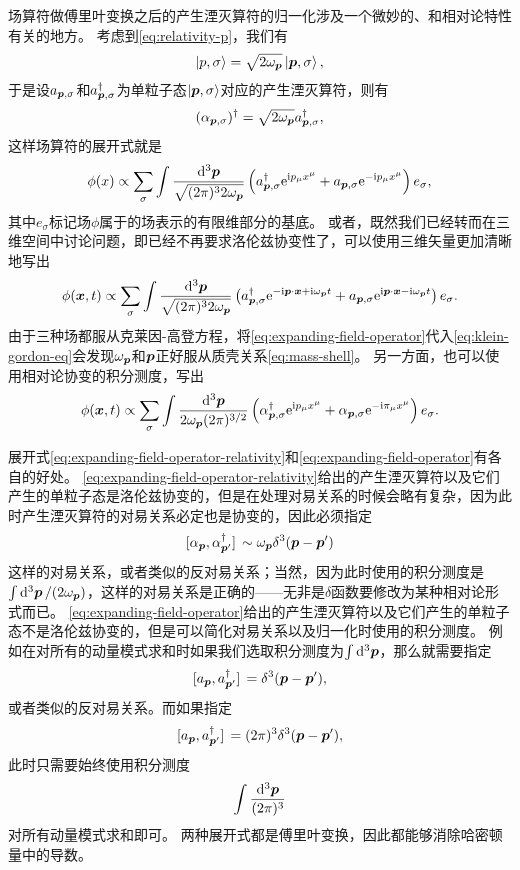 \documentclass[hyperref, UTF8, a4paper]{ctexart}
\newcommand*{\ii}{\mathrm{i}}
\newcommand*{\ee}{\mathrm{e}}
\begin{document}
场算符做傅里叶变换之后的产生湮灭算符的归一化涉及一个微妙的、和相对论特性有关的地方。
考虑到\eqref{eq:relativity-p}，我们有
\[
    \ket{p, \sigma} = \sqrt{2 \omega_{\vb*{p}}} \ket{\vb*{p}, \sigma},
\]
于是设${a}_{\vb*{p}, \sigma}$和${a}^\dagger_{\vb*{p}, \sigma}$为单粒子态$\ket{\vb*{p}, \sigma}$对应的产生湮灭算符，则有
\[
    ({\alpha}_{\vb*{p}, \sigma})^\dagger = \sqrt{2\omega_{\vb*{p}}} {a}_{\vb*{p}, \sigma}^\dagger,
\]
这样场算符的展开式就是
\[
    {\phi}(x) \propto \sum_\sigma \int \frac{\dd[3]{\vb*{p}}}{\sqrt{(2\pi)^3 2 \omega_{\vb*{p}}}} \left( {a}^\dagger_{\vb*{p}, \sigma} \ee^{\ii p_\mu x^\mu} + {a}_{\vb*{p}, \sigma} \ee^{- \ii p_\mu x^\mu} \right) e_\sigma,
\]
其中$e_\sigma$标记场$\phi$属于的场表示的有限维部分的基底。
或者，既然我们已经转而在三维空间中讨论问题，即已经不再要求洛伦兹协变性了，可以使用三维矢量更加清晰地写出
\begin{equation}
    {\phi}(\vb*{x}, t) \propto \sum_\sigma \int \frac{\dd[3]{\vb*{p}}}{\sqrt{(2\pi)^3 2 \omega_{\vb*{p}}}} \left( {a}^\dagger_{\vb*{p}, \sigma} \ee^{- \ii \vb*{p} \cdot \vb*{x} + \ii \omega_{\vb*{p}} t} + {a}_{\vb*{p}, \sigma} \ee^{\ii \vb*{p} \cdot \vb*{x} - \ii \omega_{\vb*{p}} t} \right) e_\sigma. 
    \label{eq:expanding-field-operator}
\end{equation}
由于三种场都服从克莱因-高登方程，将\eqref{eq:expanding-field-operator}代入\eqref{eq:klein-gordon-eq}会发现$\omega_{\vb*{p}}$和$\vb*{p}$正好服从质壳关系\eqref{eq:mass-shell}。
另一方面，也可以使用相对论协变的积分测度，写出
\begin{equation}
    {\phi}(\vb*{x}, t) \propto \sum_\sigma \int \frac{\dd[3]{\vb*{p}}}{2 \omega_{\vb*{p}} (2\pi)^{3/2}} \left( {\alpha}^\dagger_{\vb*{p}, \sigma} \ee^{ \ii p_\mu x^\mu} + {\alpha}_{\vb*{p}, \sigma} \ee^{- \ii \pi_\mu x^\mu} \right) e_\sigma. 
    \label{eq:expanding-field-operator-relativity}
\end{equation}

展开式\eqref{eq:expanding-field-operator-relativity}和\eqref{eq:expanding-field-operator}有各自的好处。
\eqref{eq:expanding-field-operator-relativity}给出的产生湮灭算符以及它们产生的单粒子态是洛伦兹协变的，但是在处理对易关系的时候会略有复杂，因为此时产生湮灭算符的对易关系必定也是协变的，因此必须指定
\[
    \comm*{{\alpha}_{\vb*{p}}}{{\alpha}^\dagger_{\vb*{p}'}} \sim \omega_{\vb*{p}} \delta^3 (\vb*{p} - \vb*{p}')
\]
这样的对易关系，或者类似的反对易关系；当然，因为此时使用的积分测度是$\int \dd[3]{\vb*{p}} / (2 \omega_{\vb*{p}})$，这样的对易关系是正确的——无非是$\delta$函数要修改为某种相对论形式而已。
\eqref{eq:expanding-field-operator}给出的产生湮灭算符以及它们产生的单粒子态不是洛伦兹协变的，但是可以简化对易关系以及归一化时使用的积分测度。
例如在对所有的动量模式求和时如果我们选取积分测度为$\int \dd[3]{\vb*{p}}$，那么就需要指定
\[
    \comm*{{a}_{\vb*{p}}}{{a}^\dagger_{\vb*{p}'}} = \delta^3 (\vb*{p} - \vb*{p}'),
\]
或者类似的反对易关系。而如果指定
\[
    \comm*{{a}_{\vb*{p}}}{{a}^\dagger_{\vb*{p}'}} = (2\pi)^3 \delta^3 (\vb*{p} - \vb*{p}'),
\]
此时只需要始终使用积分测度
\[
    \int \frac{\dd[3]{\vb*{p}}}{(2\pi)^3}
\]
对所有动量模式求和即可。
两种展开式都是傅里叶变换，因此都能够消除哈密顿量中的导数。
\end{document}
